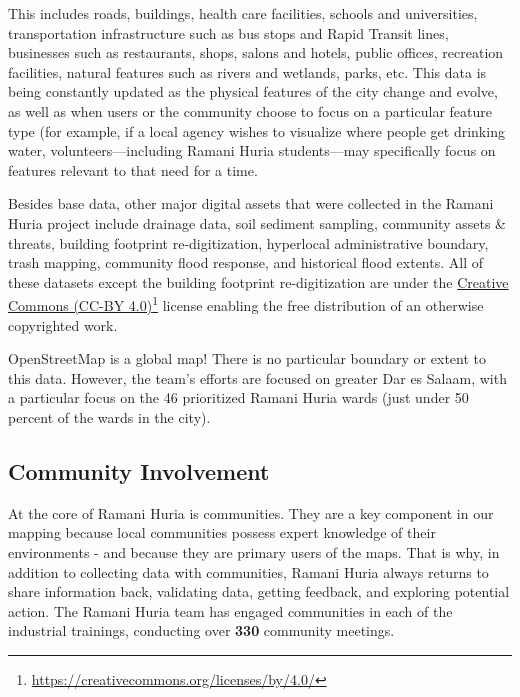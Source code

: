 \documentclass[a4paper,12pt,twoside]{article}
\begin{document}
\begin{multicols}{2}
This includes roads, buildings, health care facilities, schools and universities, transportation infrastructure such as bus stops and Rapid Transit lines, businesses such as restaurants, shops, salons and hotels, public offices, recreation facilities, natural features such as rivers and wetlands, parks, etc. This data is being constantly updated as the physical features of the city change and evolve, as well as when users or the community choose to focus on a particular feature type (for example, if a local agency wishes to visualize where people get drinking water, volunteers—including Ramani Huria students—may specifically focus on features relevant to that need for a time.

Besides base data, other major digital assets that were collected in the Ramani Huria project include drainage data, soil sediment sampling, community assets \& threats, building footprint re-digitization, hyperlocal administrative boundary, trash mapping, community flood response, and historical flood extents. All of these datasets except the building footprint re-digitization are under the \href{https://creativecommons.org/licenses/by/4.0/}{Creative Commons (CC-BY 4.0)}\footnote{\url{https://creativecommons.org/licenses/by/4.0/}} license enabling the free distribution of an otherwise copyrighted work.

OpenStreetMap is a global map! There is no particular boundary or extent to this data. However, the team’s efforts are focused on greater Dar es Salaam, with a particular focus on the 46 prioritized Ramani Huria wards (just under 50 percent of the wards in the city).
\end{multicols}

\subsection{Community Involvement}
\begin{multicols}{2}
At the core of Ramani Huria is communities. They are a key component in our mapping because local communities possess expert knowledge of their environments - and because they are primary users of the maps. That is why, in addition to collecting data with communities, Ramani Huria always returns to share information back, validating data, getting feedback, and exploring potential action. The Ramani Huria team has engaged communities in each of the industrial trainings, conducting over \textbf{330}  community meetings. 
\end{multicols}
\medskip
\end{document}
